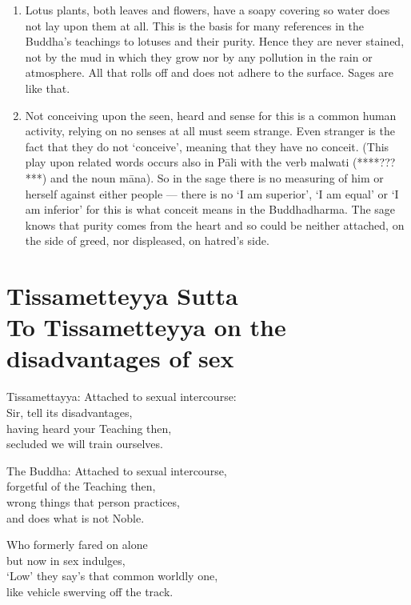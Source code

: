 \begin{enumerate}
\item Lotus plants, both leaves and flowers, have a soapy covering so water does not lay upon them at all. This is the basis for many references in the Buddha's teachings to lotuses and their purity. Hence they are never stained, not by the mud in which they grow nor by any pollution in the rain or atmosphere. All that rolls off and does not adhere to the surface. Sages are like that.\\

\item Not conceiving upon the seen, heard and sense for this is a common human activity, relying on no senses at all must seem strange. Even stranger is the fact that they do not `conceive', meaning that they have no conceit. (This play upon related words occurs also in P\=ali with the verb malwati (****???***) and the noun m\=ana). So in the sage there is no measuring of him or herself against either people — there is no `I am superior', `I am equal' or `I am inferior' for this is what conceit means in the Buddhadharma. The sage knows that purity comes from the heart and so could be neither attached, on the side of greed, nor displeased, on hatred's side.
\end{enumerate}   


\chapter{Tissametteyya Sutta\\ To Tissametteyya on the disadvantages of sex}

\begin{MyDescription}{Tissamettayya:}
Attached to sexual intercourse:\\
Sir, tell its disadvantages,\\
having heard your Teaching then,\\
secluded we will train ourselves.
\end{MyDescription}
   
\begin{MyDescription}{The Buddha:}
Attached to sexual intercourse,\\
forgetful of the Teaching then,\\
wrong things that person practices,\\
and does what is not Noble.
\end{MyDescription}

\begin{MyDescription}{}
Who formerly fared on alone\\
but now in sex indulges,\\
`Low' they say's that common worldly one,\\
like vehicle swerving off the track.
\end{MyDescription}

